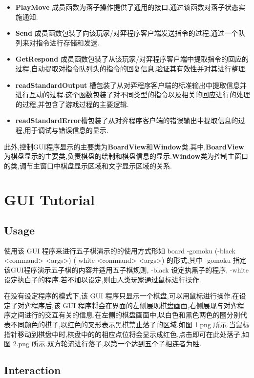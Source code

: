 \documentclass[twocolumn]{article}
\begin{document}
\begin{itemize}
	\item \textbf{PlayMove} 成员函数为落子操作提供了通用的接口,通过该函数对落子状态实施通知.
	\item \textbf{Send} 成员函数包装了向该玩家/对弈程序客户端发送指令的过程,通过一个队列来对指令进行存储和发送.
	\item \textbf{GetRespond} 成员函数包装了从该玩家/对弈程序客户端中提取指令的回应的过程,自动提取对指令队列头的指令的回复信息,验证其有效性并对其进行整理.
	\item \textbf{readStandardOutput} 槽包装了从对弈程序客户端的标准输出中提取信息并进行互动的过程.这个函数包装了对不同类型的指令以及相关的回应进行的处理的过程,并包含了游戏过程的主要逻辑.
	\item \textbf{readStandardError}槽包装了从对弈程序客户端的错误输出中提取信息的过程,用于调试与错误信息的显示.
\end{itemize}

此外,控制GUI程序显示的主要类为\textbf{BoardView}和\textbf{Window}类.其中,\textbf{BoardView}为棋盘显示的主要类,负责棋盘的绘制和棋盘信息的显示.\textbf{Window}类为控制主窗口的类,调节主窗口中棋盘显示区域和文字显示区域的关系.

\section{GUI Tutorial}

\subsection{Usage}

使用该 GUI 程序来进行五子棋演示的的使用方式形如 board -gomoku (-black <command> <args>) (-white <command> <args>) 的形式,其中 -gomoku 指定该GUI程序演示五子棋的内容并适用五子棋规则, -black 设定执黑子的程序, -white 设定执白子的程序.若不加以设定,则由人类玩家通过鼠标进行操作.

在没有设定程序的模式下,该 GUI 程序只显示一个棋盘,可以用鼠标进行操作.在设定了对弈程序后,该 GUI 程序将会在界面的左侧展现棋盘画面,右侧展现与对弈程序之间进行的交互有关的信息.在左侧的棋盘画面中,以白色和黑色两色的圈分别代表不同颜色的棋子,以红色的叉形表示黑棋禁止落子的区域.如图 1.png 所示.当鼠标指针移动到棋盘中时,棋盘中的的相应点位将会显示成红色,点击即可在此处落子,如图 2.png 所示.双方轮流进行落子,以第一个达到五个子相连者为胜.

\subsection{Interaction}
\end{document}
